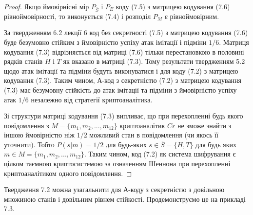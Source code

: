 \begin{proof}
    Якщо ймовірнісні мір $P_{\overline{S}}$ і $P_E$ коду (7.5) з матрицею кодування (7.6)
    рівноймовірності, то виконується (7.4) і розподіл $P_M$ є рівноймовірним.
    
    За твердженням 6.2 лекції 6 код без секретності (7.5) з матрицею кодування (7.6)
    буде безумовно стійким з ймовірністю успіху атак імітації і підміни $1/6$. Матриця
    кодування (7.3) відрізняється від матриці (7.6) тільки перестановкою в половині
    рядків станів $H$ і $T$ як вказано в матриці (7.3). Тому результати твердженням 5.2
    щодо атак імітації та підміни будуть виконуватися і для коду (7.2) з матрицею
    кодування (7.3). Таким чином, А-код з секретністю (7.2) з матрицею кодування
    (7.3) має безумовну стійкість до атак імітації та підміни з ймовірністю успіху атак
    $1/6$ незалежно від стратегії криптоаналітика.
    
    Зі структури матриці кодування (7.3) випливає, що при перехопленні будь якого
    повідомлення з $M = \{m_1, m_2, ..., m_{12}\}$ криптоаналітик $Cr$ не зможе знайти з
    іншою ймовірністю ніж $1/2$ можливий стан в повідомлення (чи якось її уточнити).
    Тобто $P(s|m) = 1/2$ для будь-яких $s \in \overline{S} = \{H, T\}$ для будь яких
    $m \in M = \{m_1, m_2, ..., m_{12}\}$. Таким чином, код (7.2) як система шифрування є цілком
    таємною криптосистемою за означенням Шеннона при перехопленні
    криптоаналітиком одного повідомлення.
\end{proof}

Твердження 7.2 можна узагальнити для А-коду з секретністю з довільною
множиною станів і довільним рівнем стійкості. Продемонструємо це на прикладі 7.3.

